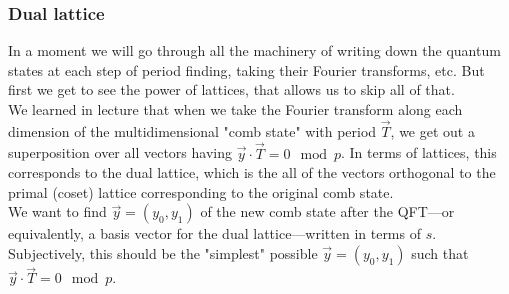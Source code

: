 \noindent{}

\subsubsection{Dual lattice}
In a moment we will go through all the machinery of writing down the quantum states at each step of period finding, taking their Fourier transforms, etc. But first we get to see the power of lattices, that allows us to skip all of that. \\

We learned in lecture that when we take the Fourier transform along each dimension of the multidimensional "comb state" with period $\vec{T}$, we get out a superposition over all vectors having $\vec{y} \cdot \vec{T} = 0 \mod p$. In terms of lattices, this corresponds to the dual lattice, which is the all of the vectors orthogonal to the primal (coset) lattice corresponding to the original comb state. \\

We want to find $\vec{y} = (y_0, y_1)$ of the new comb state after the QFT---or equivalently, a basis vector for the dual lattice---written in terms of $s$. Subjectively, this should be the "simplest" possible $\vec{y} = (y_0, y_1)$ such that $\vec{y} \cdot \vec{T} = 0 \mod p$. \\

\noindent{}


